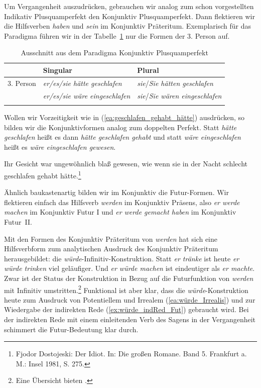 Um Vergangenheit auszudrücken, gebrauchen wir analog zum schon vorgestellten Indikativ Plusquamperfekt den Konjunktiv Plusquamperfekt. Dann flektieren wir die Hilfsverben \textit{haben} und \textit{sein} im Konjunktiv Präteritum. Exemplarisch für das Paradigma führen wir in der Tabelle~\ref{tab:KonjPQF} nur die Formen der 3. Person auf.

\begin{table}
  \centering
  \begin{tabular}{l l l}
    \lsptoprule
    & Singular & Plural \\
    \hline
    3. Person & \textit{er/es/sie hätte geschlafen} & \textit{sie}/\textit{Sie hätten geschlafen} \\
    
    & \textit{er/es/sie wäre eingeschlafen} & \textit{sie}/\textit{Sie wären eingeschlafen} \\
    \lspbottomrule 
  \end{tabular}
  \caption{Ausschnitt aus dem Paradigma Konjunktiv Plusquamperfekt}
  \label{tab:KonjPQF}
\end{table}
 
Wollen wir Vorzeitigkeit wie in (\ref{ea:geschlafen_gehabt_hätte}) ausdrücken, so bilden wir die Konjunktivformen analog zum doppelten Perfekt. Statt \textit{hätte geschlafen} heißt es dann \textit{hätte geschlafen gehabt} und statt \textit{wäre eingeschlafen} heißt es \textit{wäre eingeschlafen gewesen}. 

\ea \label{ea:geschlafen_gehabt_hätte} Ihr Gesicht war ungewöhnlich blaß gewesen, wie wenn sie in der Nacht schlecht geschlafen gehabt hätte.\footnote{Fjodor Dostojeski: Der Idiot. In: Die großen Romane. Band 5. Frankfurt a. M.: Insel 1981, S. 275.}
\z 

Ähnlich baukastenartig bilden wir im Konjunktiv die Futur-Formen. Wir flektieren einfach das Hilfsverb \textit{werden} im Konjunktiv Präsens, also \zB \textit{er werde machen} im Konjunktiv Futur I und \textit{er werde gemacht haben} im Konjunktiv Futur~II.

Mit den Formen des Konjunktiv Präteritum von \textit{werden} hat sich eine Hilfsverbform zum analytischen Ausdruck des Konjunktiv Präteritum herausgebildet: die \textit{würde}-Infinitiv-Konstruktion. Statt \textit{er tränke} ist heute \textit{er würde trinken} viel geläufiger. Und \textit{er würde machen} ist eindeutiger als \textit{er machte}. Zwar ist der Status der Konstruktion in Bezug auf die Futurfunktion von \textit{werden} mit Infinitiv umstritten.\footnote{Eine Übersicht bieten \citet[27--31]{ThieroffVogel2012}.} Funktional ist aber klar, dass die \textit{würde}-Konstruktion heute zum Ausdruck von Potentiellem und Irrealem (\ref{ea:würde_Irrealis}) und zur Wiedergabe der indirekten Rede (\ref{ex:würde_indRed_Fut}) gebraucht wird. Bei der indirekten Rede mit einem einleitenden Verb des Sagens in der Vergangenheit schimmert die Futur-Bedeutung klar durch.


